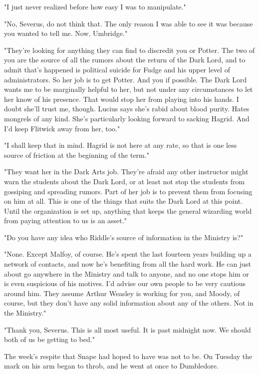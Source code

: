 \documentclass[a4paper,11pt]{article}
\begin{document}
"I just never realized before how easy I was to manipulate."

"No, Severus, do not think that. The only reason I was able to see it was because you wanted to tell me. Now, Umbridge."

"They're looking for anything they can find to discredit you or Potter. The two of you are the source of all the rumors about the return of the Dark Lord, and to admit that's happened is political suicide for Fudge and his upper level of administrators. So her job is to get Potter. And you if possible. The Dark Lord wants me to be marginally helpful to her, but not under any circumstances to let her know of his presence. That would stop her from playing into his hands. I doubt she'll trust me, though. Lucius says she's rabid about blood purity. Hates mongrels of any kind. She's particularly looking forward to sacking Hagrid. And I'd keep Flitwick away from her, too."

"I shall keep that in mind. Hagrid is not here at any rate, so that is one less source of friction at the beginning of the term."

"They want her in the Dark Arts job. They're afraid any other instructor might warn the students about the Dark Lord, or at least not stop the students from gossiping and spreading rumors. Part of her job is to prevent them from focusing on him at all. This is one of the things that suits the Dark Lord at this point. Until the organization is set up, anything that keeps the general wizarding world from paying attention to us is an asset."

"Do you have any idea who Riddle's source of information in the Ministry is?"

"None. Except Malfoy, of course. He's spent the last fourteen years building up a network of contacts, and now he's benefiting from all the hard work. He can just about go anywhere in the Ministry and talk to anyone, and no one stops him or is even suspicious of his motives. I'd advise our own people to be very cautious around him. They assume Arthur Weasley is working for you, and Moody, of course, but they don't have any solid information about any of the others. Not in the Ministry."

"Thank you, Severus. This is all most useful. It is past midnight now. We should both of us be getting to bed."

The week's respite that Snape had hoped to have was not to be. On Tuesday the mark on his arm began to throb, and he went at once to Dumbledore.
\end{document}
